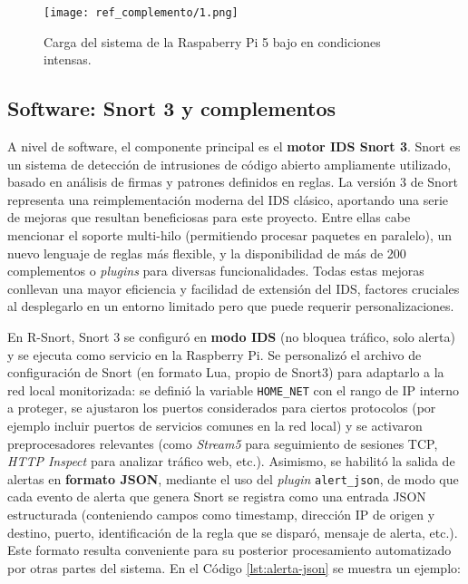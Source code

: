 \documentclass[11pt,a4paper,twoside]{report}
\begin{document}
\begin{figure}[H]
	\centering
	\texttt{[image: ref\_complemento/1.png]}
	\caption{Carga del sistema de la Raspaberry Pi 5 bajo en condiciones intensas.}
	\label{fig:raspberry-carga-sistema-extrema}
\end{figure}


\subsection{Software: Snort 3 y complementos}
A nivel de software, el componente principal es el \textbf{motor IDS Snort 3}. Snort es un sistema de detección de intrusiones de código abierto ampliamente utilizado, basado en análisis de firmas y patrones definidos en reglas. La versión 3 de Snort representa una reimplementación moderna del IDS clásico, aportando una serie de mejoras que resultan beneficiosas para este proyecto. Entre ellas cabe mencionar el soporte multi-hilo (permitiendo procesar paquetes en paralelo), un nuevo lenguaje de reglas más flexible, y la disponibilidad de más de 200 complementos o \emph{plugins} para diversas funcionalidades. Todas estas mejoras conllevan una mayor eficiencia y facilidad de extensión del IDS, factores cruciales al desplegarlo en un entorno limitado pero que puede requerir personalizaciones.\newline

En R-Snort, Snort 3 se configuró en \textbf{modo IDS} (no bloquea tráfico, solo alerta) y se ejecuta como servicio en la Raspberry Pi. Se personalizó el archivo de configuración de Snort (en formato Lua, propio de Snort3) para adaptarlo a la red local monitorizada: se definió la variable \texttt{HOME\_NET} con el rango de IP interno a proteger, se ajustaron los puertos considerados para ciertos protocolos (por ejemplo incluir puertos de servicios comunes en la red local) y se activaron preprocesadores relevantes (como \emph{Stream5} para seguimiento de sesiones TCP, \emph{HTTP Inspect} para analizar tráfico web, etc.). Asimismo, se habilitó la salida de alertas en \textbf{formato JSON}, mediante el uso del \emph{plugin} \texttt{alert\_json}, de modo que cada evento de alerta que genera Snort se registra como una entrada JSON estructurada (conteniendo campos como timestamp, dirección IP de origen y destino, puerto, identificación de la regla que se disparó, mensaje de alerta, etc.). Este formato resulta conveniente para su posterior procesamiento automatizado por otras partes del sistema. En el Código \ref{lst:alerta-json} se muestra un ejemplo:
\end{document}
